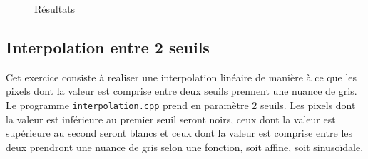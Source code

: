 \documentclass[11pt]{article}
\begin{document}
\begin{figure}[!htb]
  \centering
  \caption{Résultats}
\end{figure}
 
\FloatBarrier

\clearpage
\subsection{Interpolation entre 2 seuils}
Cet exercice consiste à realiser une interpolation linéaire de manière à ce que les pixels dont la valeur est comprise entre deux seuils prennent une nuance de gris. Le programme \texttt{interpolation.cpp} prend en paramètre 2 seuils. Les pixels dont la valeur est inférieure au premier seuil seront noirs, ceux dont la valeur est supérieure au second seront blancs et ceux dont la valeur est comprise entre les deux prendront une nuance de gris selon une fonction, soit affine, soit sinusoïdale.
\end{document}
